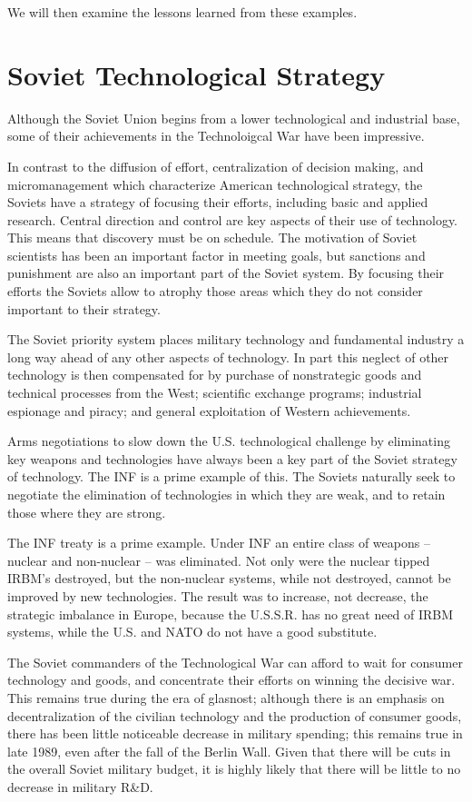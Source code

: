 \documentclass[a4paper,12pt]{book}
\begin{document}
We will then examine the lessons learned from these examples.

\section{Soviet Technological Strategy}
Although the Soviet Union begins from a lower technological and industrial base, some of their achievements in the Technoloigcal War have been impressive.

In contrast to the diffusion of effort, centralization of decision making, and micromanagement which characterize American technological strategy, the Soviets have a strategy of focusing their efforts, including basic and applied research. Central direction and control are key aspects of their use of technology. This means that discovery must be on schedule. The motivation of Soviet scientists has been an important factor in meeting goals, but sanctions and punishment are also an important part of the Soviet system. By focusing their efforts the Soviets allow to atrophy those areas which they do not consider important to their strategy.

The Soviet priority system places military technology and fundamental industry a long way ahead of any other aspects of technology. In part this neglect of other technology is then compensated for by purchase of nonstrategic goods and technical processes from the West; scientific exchange programs; industrial espionage and piracy; and general exploitation of Western achievements.

Arms negotiations to slow down the U.S. technological challenge by eliminating key weapons and technologies have always been a key part of the Soviet strategy of technology. The INF is a prime example of this. The Soviets naturally seek to negotiate the elimination of technologies in which they are weak, and to retain those where they are strong.

The INF treaty is a prime example. Under INF an entire class of weapons -- nuclear and non-nuclear -- was eliminated. Not only were the nuclear tipped IRBM's destroyed, but the non-nuclear systems, while not destroyed, cannot be improved by new technologies. The result was to increase, not decrease, the strategic imbalance in Europe, because the U.S.S.R. has no great need of IRBM systems, while the U.S. and NATO do not have a good substitute.

The Soviet commanders of the Technological War can afford to wait for consumer technology and goods, and concentrate their efforts on winning the decisive war. This remains true during the era of glasnost; although there is an emphasis on decentralization of the civilian technology and the production of consumer goods, there has been little noticeable decrease in military spending; this remains true in late 1989, even after the fall of the Berlin Wall. Given that there will be cuts in the overall Soviet military budget, it is highly likely that there will be little to no decrease in military R\&D.
\end{document}
